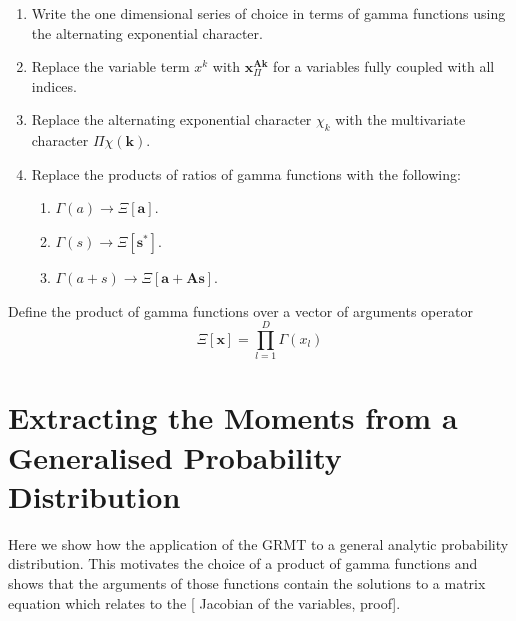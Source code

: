 \documentclass{article}
\begin{document}
\begin{enumerate}
\item Write the one dimensional series of choice in terms of gamma functions using the alternating exponential character.
\item Replace the variable term $x^k$ with $\mathbf{x}^{\mathbf{A}\mathbf{k}}_\Pi$ for a variables fully coupled with all indices.
\item Replace the alternating exponential character $\chi_k$ with the multivariate character $\Pi\chi(\mathbf{k})$.
\item Replace the products of ratios of gamma functions with the following:
\begin{enumerate}
\item $\Gamma(a) \to \Xi[\mathbf{a}]$.
\item $\Gamma(s) \to \Xi[\mathbf{s}^*]$.
\item $\Gamma(a+s) \to \Xi[\mathbf{a}+\mathbf{A}\mathbf{s}]$.
\end{enumerate}
\end{enumerate}

Define the product of gamma functions over a vector of arguments operator
\begin{equation}
\Xi[\mathbf{x}] = \prod_{l=1}^D \Gamma(x_l)
\end{equation}


\section{Extracting the Moments from a Generalised Probability Distribution}
Here we show how the application of the GRMT to a general analytic probability distribution. This motivates the choice of a product of gamma functions and shows that the arguments of those functions contain the solutions to a matrix equation which relates to the [{\color{red} Jacobian of the variables}, proof].
\end{document}
